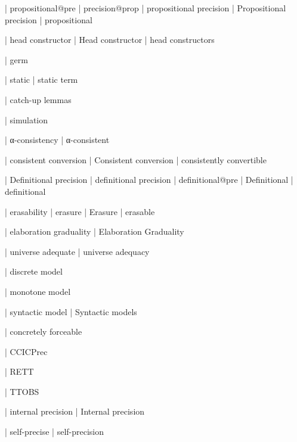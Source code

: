   | propositional@pre
  | precision@prop
  | propositional precision
  | Propositional precision
  | propositional


 | head constructor
 | Head constructor
 | head constructors

  | germ

  | static
  | static term

  | catch-up lemmas

  | simulation

  | α-consistency
  | α-consistent

  | consistent conversion
  | Consistent conversion
  | consistently convertible

  | Definitional precision
  | definitional precision
  | definitional@pre
  | Definitional
  | definitional

  | erasability
  | erasure
  | Erasure
  | erasable

  | elaboration graduality
  | Elaboration Graduality

  | universe adequate
  | universe adequacy


  | discrete model

  | monotone model

  | syntactic model
  | Syntactic models

  | concretely forceable

  | CCICPrec

  | RETT

  | TTOBS

  | internal precision
  | Internal precision

  | self-precise
  | self-precision